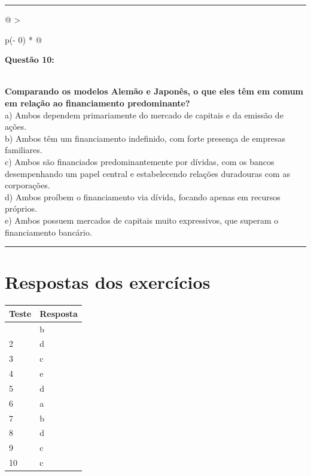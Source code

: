 \documentclass[
]{book}
\begin{document}
\begin{center}\rule{0.5\linewidth}{0.5pt}\end{center}

\begin{longtable}[]{@{}
  >{\raggedright\arraybackslash}p{(\columnwidth - 0\tabcolsep) * }@{}}
\toprule\noalign{}
\begin{minipage}[b]{\linewidth}\raggedright
\textbf{Questão 10:}
\end{minipage} \\
\midrule\noalign{}
\endhead
\bottomrule\noalign{}
\endlastfoot
\textbf{Comparando os modelos Alemão e Japonês, o que eles têm em comum em relação ao financiamento predominante?} \\
a) Ambos dependem primariamente do mercado de capitais e da emissão de ações. \\
b) Ambos têm um financiamento indefinido, com forte presença de empresas familiares. \\
c) Ambos são financiados predominantemente por dívidas, com os bancos desempenhando um papel central e estabelecendo relações duradouras com as corporações. \\
d) Ambos proíbem o financiamento via dívida, focando apenas em recursos próprios. \\
e) Ambos possuem mercados de capitais muito expressivos, que superam o financiamento bancário. \\
\end{longtable}

\begin{center}\rule{0.5\linewidth}{0.5pt}\end{center}

\section{Respostas dos exercícios}\label{respostas-dos-exercuxedcios}

\begin{longtable}[]{@{}ll@{}}
\toprule\noalign{}
Teste & Resposta \\
\midrule\noalign{}
\endhead
\bottomrule\noalign{}
\endlastfoot
1 & b \\
2 & d \\
3 & c \\
4 & e \\
5 & d \\
6 & a \\
7 & b \\
8 & d \\
9 & c \\
10 & c \\
\end{longtable}
\end{document}
